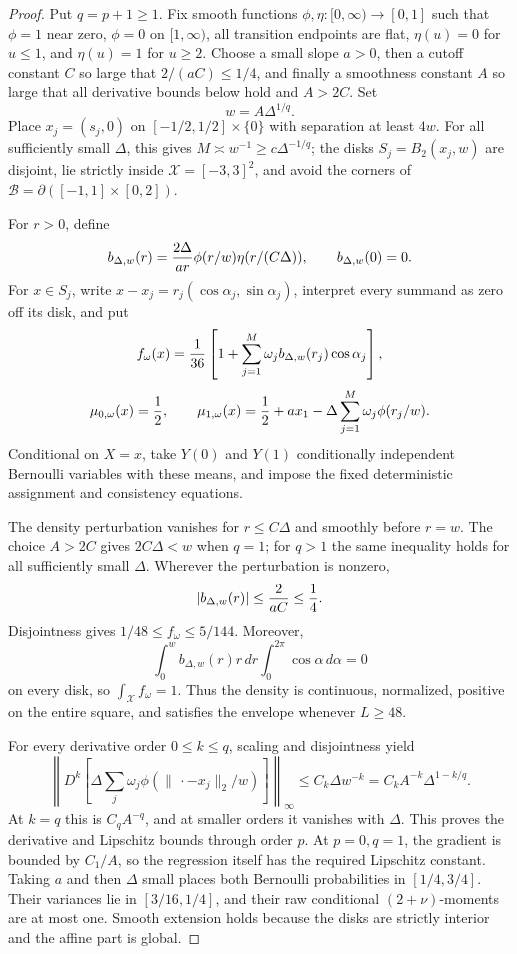\documentclass{article}
\begin{document}
\begin{proof}
Put \(q=p+1\geq1\).  Fix smooth functions \(\phi,\eta:[0,\infty)\to[0,1]\) such that \(\phi=1\) near zero, \(\phi=0\) on \([1,\infty)\), all transition endpoints are flat, \(\eta(u)=0\) for \(u\leq1\), and \(\eta(u)=1\) for \(u\geq2\).  Choose a small slope \(a>0\), then a cutoff constant \(C\) so large that \(2/(aC)\leq1/4\), and finally a smoothness constant \(A\) so large that all derivative bounds below hold and \(A>2C\).  Set
\[
 w=A\Delta^{1/q}.
\]
Place \(x_j=(s_j,0)\) on \([-1/2,1/2]\times\{0\}\) with separation at least \(4w\).  For all sufficiently small \(\Delta\), this gives \(M\asymp w^{-1}\geq c\Delta^{-1/q}\); the disks \(S_j=B_2(x_j,w)\) are disjoint, lie strictly inside \(\mathcal X=[-3,3]^2\), and avoid the corners of \(\mathcal B=\partial([-1,1]\times[0,2])\).

For \(r>0\), define
\[
 b_{\Delta,w}(r)={2\Delta\over ar}\phi(r/w)\eta(r/(C\Delta)),
 \qquad b_{\Delta,w}(0)=0.
\]
For \(x\in S_j\), write \(x-x_j=r_j(\cos\alpha_j,\sin\alpha_j)\), interpret every summand as zero off its disk, and put
\[
 f_\omega(x)={1\over36}\left[1+\sum_{j=1}^M\omega_jb_{\Delta,w}(r_j)\cos\alpha_j\right],
\]
\[
 \mu_{0,\omega}(x)={1\over2},
 \qquad
 \mu_{1,\omega}(x)={1\over2}+ax_1-\Delta\sum_{j=1}^M\omega_j\phi(r_j/w).
\]
Conditional on \(X=x\), take \(Y(0)\) and \(Y(1)\) conditionally independent Bernoulli variables with these means, and impose the fixed deterministic assignment and consistency equations.

The density perturbation vanishes for \(r\leq C\Delta\) and smoothly before \(r=w\).  The choice \(A>2C\) gives \(2C\Delta<w\) when \(q=1\); for \(q>1\) the same inequality holds for all sufficiently small \(\Delta\).  Wherever the perturbation is nonzero,
\[
 |b_{\Delta,w}(r)|\leq {2\over aC}\leq{1\over4}.
\]
Disjointness gives \(1/48\leq f_\omega\leq5/144\).  Moreover,
\[
 \int_0^w b_{\Delta,w}(r)r\,dr\int_0^{2\pi}\cos\alpha\,d\alpha=0
\]
on every disk, so \(\int_{\mathcal X}f_\omega=1\).  Thus the density is continuous, normalized, positive on the entire square, and satisfies the envelope whenever \(L\geq48\).

For every derivative order \(0\leq k\leq q\), scaling and disjointness yield
\[
 \left\|D^k\left[\Delta\sum_j\omega_j
 \phi(\|\,\cdot-x_j\|_2/w)\right]\right\|_\infty
 \leq C_k\Delta w^{-k}
 =C_kA^{-k}\Delta^{1-k/q}.
\]
At \(k=q\) this is \(C_qA^{-q}\), and at smaller orders it vanishes with \(\Delta\).  This proves the derivative and Lipschitz bounds through order \(p\).  At \(p=0,q=1\), the gradient is bounded by \(C_1/A\), so the regression itself has the required Lipschitz constant.  Taking \(a\) and then \(\Delta\) small places both Bernoulli probabilities in \([1/4,3/4]\).  Their variances lie in \([3/16,1/4]\), and their raw conditional \((2+\nu)\)-moments are at most one.  Smooth extension holds because the disks are strictly interior and the affine part is global.


\end{proof}
\end{document}
